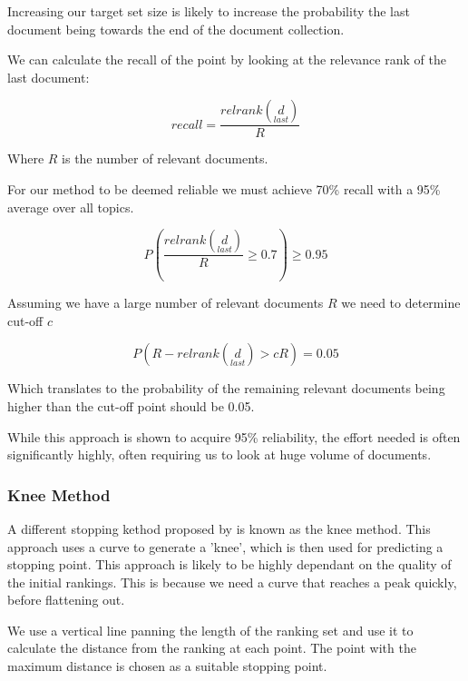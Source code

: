 Increasing our target set size is likely to increase the probability the last document being towards the end of the document collection.

We can calculate the recall of the point by looking at the relevance rank of the last document:

\begin{equation}
	  recall = \frac{relrank(\underset{last}{d})}{R}
\end{equation}

Where $R$ is the number of relevant documents.


For our method to be deemed reliable we must achieve 70\% recall with a 95\% average over all topics.

\begin{equation}
	  P(\frac{relrank(\underset{last}{d})}{R} \geqslant 0.7) \geqslant 0.95
\end{equation}


Assuming we have a large number of relevant documents $R$ we need to determine cut-off $c$

\begin{equation}
	  P(R - relrank(\underset{last}{d}) > cR) = 0.05
\end{equation}

Which translates to the probability of the remaining relevant documents being higher than the cut-off point should be 0.05.




While this approach is shown to acquire 95\% reliability, the effort needed is often significantly highly, often requiring us to look at huge volume of documents.

\subsubsection{Knee Method}

A different stopping kethod proposed by \cite{Satopa11} is known as the knee method. This approach uses a curve to generate a 'knee', which is then used for predicting a stopping point. This approach is likely to be highly dependant on the quality of the initial rankings. This is because we need a curve that reaches a peak quickly, before flattening out.

We use a vertical line panning the length of the ranking set and use it to calculate the distance from the ranking at each point. The point with the maximum distance is chosen as a suitable stopping point.

